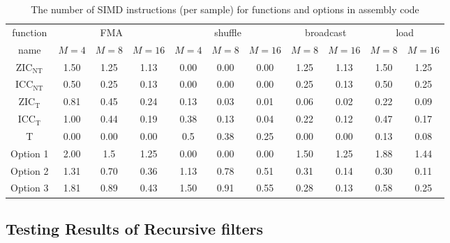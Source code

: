 \begin{table}[t]
    \caption{The number of SIMD instructions (per sample) for functions and options in assembly code}  %
    \centering %
    \setlength{\tabcolsep}{1.2pt}
    \begin{tabular}{c|c|c|c|c|c|c|c|c|c|c} %
    \hline\hline %
    function & \multicolumn{3}{c|}{FMA} & \multicolumn{3}{c|}{shuffle} & \multicolumn{2}{c|}{broadcast} & \multicolumn{2}{c}{load} \\ [0.4ex]
    \cline{2-11}
    name & $M{=}4$ & $M{=}8$ & $M{=}16$ & $M{=}4$ & $M{=}8$ & $M{=}16$ & $M{=}8$ & $M{=}16$ & $M{=}8$ & $M{=}16$ \\ [0.4ex] %
    \hline
    $\text{ZIC}_{\text{NT}}$ & 1.50 & 1.25 & 1.13 & 0.00 & 0.00 & 0.00 & 1.25 & 1.13 & 1.50 & 1.25 \\ [0.4ex]
    $\text{ICC}_{\text{NT}}$ & 0.50 & 0.25 & 0.13 & 0.00 & 0.00 & 0.00 & 0.25 & 0.13 & 0.50 & 0.25 \\ [0.4ex]
    $\text{ZIC}_{\text{T}}$ & 0.81 & 0.45 & 0.24 & 0.13 & 0.03 & 0.01 & 0.06 & 0.02 & 0.22 & 0.09 \\ [0.4ex]
    $\text{ICC}_{\text{T}}$ & 1.00 & 0.44 & 0.19 & 0.38 & 0.13 & 0.04 & 0.22 & 0.12 & 0.47 & 0.17 \\ [0.4ex]
    T & 0.00 & 0.00 & 0.00 & 0.5 & 0.38 & 0.25 & 0.00 & 0.00 & 0.13 & 0.08 \\ [0.4ex]
    Option 1 & 2.00 & 1.5 & 1.25 & 0.00 & 0.00 & 0.00 & 1.50 & 1.25 & 1.88 & 1.44 \\ [0.4ex]
    Option 2 & 1.31 & 0.70 & 0.36  & 1.13 & 0.78 & 0.51 & 0.31 & 0.14 & 0.30 & 0.11 \\ [0.4ex]
    Option 3 & 1.81 & 0.89 & 0.43 & 1.50 & 0.91 & 0.55 & 0.28 & 0.13 & 0.58 & 0.25 \\ [0.4ex]
    \hline
    \end{tabular}
    \label{table:number_of_instructions_of_functions_in_assembly} %
\end{table} 


\subsection{Testing Results of Recursive filters}

